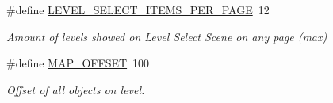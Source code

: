 \begin{DoxyCompactItemize}
\mbox{\label{group___library_merger_ga9c8eceb33583592db0673d5c43620a35}} 
\#define \hyperlink{group___library_merger_ga9c8eceb33583592db0673d5c43620a35}{L\+E\+V\+E\+L\+\_\+\+S\+E\+L\+E\+C\+T\+\_\+\+I\+T\+E\+M\+S\+\_\+\+P\+E\+R\+\_\+\+P\+A\+GE}~12
\begin{DoxyCompactList}\small\item\em Amount of levels showed on Level Select Scene on any page (max) \end{DoxyCompactList}\item 
\mbox{\label{group___library_merger_ga6012442435a7f8303b0ed3c7152d52ea}} 
\#define \hyperlink{group___library_merger_ga6012442435a7f8303b0ed3c7152d52ea}{M\+A\+P\+\_\+\+O\+F\+F\+S\+ET}~100
\begin{DoxyCompactList}\small\item\em Offset of all objects on level. \end{DoxyCompactList}\end{DoxyCompactItemize}

